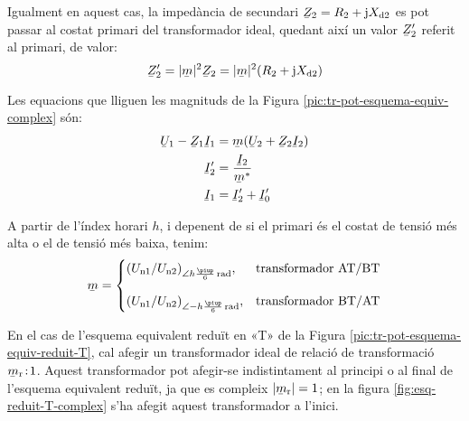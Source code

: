 \begin{center}
    
    \label{pic:tr-pot-esquema-equiv-complex}
\end{center}

Igualment en aquest cas, la impedància de secundari $\cmplx{Z}_2=R_2 + \ju X\ped{d2}$ es pot passar al costat primari del transformador ideal, quedant així un valor $\cmplx{Z}_2'$ referit al primari, de valor:
\begin{equation}
    \cmplx{Z}_2' = |\cmplx{m}|^2 \cmplx{Z}_2  = |\cmplx{m}|^2 (R_2 + \ju X\ped{d2})\label{eq:ZmZ}
\end{equation}

Les equacions que lliguen les magnituds de la Figura \vref{pic:tr-pot-esquema-equiv-complex} són:
\begin{subequations}
\begin{align}
    \cmplx{U}_1 - \cmplx{Z}_1 \cmplx{I}_1 &= \cmplx{m} ( \cmplx{U}_2  + \cmplx{Z}_2 \cmplx{I}_2 ) \label{eq:UmZ}\\
    \cmplx{I}'_2 &= \frac{\cmplx{I}_2}{\cmplx{m}^*} \label{eq:ImI}\\
    \cmplx{I}_1  &=   \cmplx{I}_2' + \cmplx{I}_0' \label{eq:III}
\end{align}
\end{subequations}

A partir de l'índex horari $h$, i depenent de si el primari és el costat de tensió més alta o el de tensió més baixa, tenim:
\begin{equation}
\cmplx{m} = \begin{cases}
     (U\ped{n1}/U\ped{n2})_{\angle h \frac{\piup}{6}\si{\,rad}}, & \text{transformador AT/BT}\\[2.7ex]
     (U\ped{n1}/U\ped{n2})_{\angle -h \frac{\piup}{6}\si{\,rad}}, & \text{transformador BT/AT}
\end{cases}
\label{eq:rel-transf-cmplx}
\end{equation}

En el cas de l'esquema equivalent reduït en «T» de la Figura \vref{pic:tr-pot-esquema-equiv-reduit-T}, cal afegir un transformador ideal de relació de transformació  $\cmplx{m}\ped{r}\!:\!1$. Aquest transformador pot afegir-se indistintament  al principi o al final de l'esquema equivalent reduït, ja que es compleix $|\cmplx{m}\ped{r}|=1$;  en la figura \vref{fig:esq-reduit-T-complex} s'ha afegit aquest transformador a l'inici.

